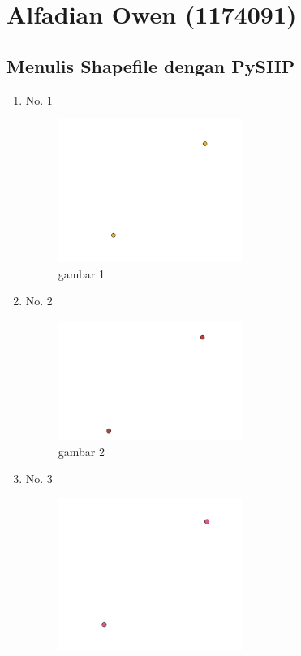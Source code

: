 \section{Alfadian Owen (1174091)}
\subsection{Menulis Shapefile dengan PySHP}
\begin{enumerate}
	\item No. 1
	
	\begin{figure}[H]
		\includegraphics[width=6cm]{figures/Tugas2/1174091/1.png}
		\centering
		\caption{gambar 1}
	\end{figure}
	\item No. 2
	
	\begin{figure}[H]
		\includegraphics[width=6cm]{figures/Tugas2/1174091/2.png}
		\centering
		\caption{gambar 2}
	\end{figure}
	\item No. 3
	
	\begin{figure}[H]
		\includegraphics[width=6cm]{figures/Tugas2/1174091/3.png}

\end{figure}
\end{enumerate}
